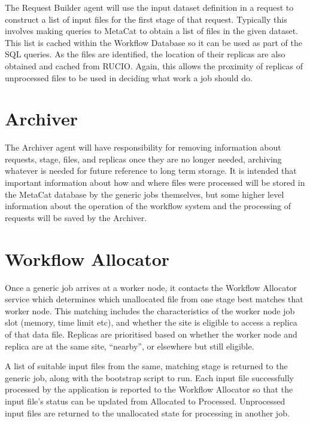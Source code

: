 \documentclass[../main-v1.tex]{subfiles}
\begin{document}
The Request Builder agent will use the input dataset definition in a request to construct a list of input files for the first stage of that request. Typically this involves making queries to MetaCat to obtain a list of files in the given dataset. This list is cached within the Workflow Database so it can be used as part of the SQL queries. As the files are identified, the location of their replicas are also obtained and cached from RUCIO. Again, this allows the proximity of replicas of unprocessed files to be used in deciding what work a job should do.

\section{Archiver}
\label{sec:flow:archiver}

The Archiver agent will have responsibility for removing information about requests, stage, files, and replicas once they are no longer needed, archiving whatever is needed for future reference to long term storage. It is intended that important information about how and where files were processed will be stored in the MetaCat database by the generic jobs themselves, but some higher level information about the operation of the workflow system and the processing of requests will be saved by the Archiver.

\section{Workflow Allocator}
\label{sec:flow:allocator}

Once a generic job arrives at a worker node, it contacts the Workflow Allocator service which determines which unallocated file from one stage best matches that worker node. This matching includes the characteristics of the worker node job slot (memory, time limit etc), and whether the site is eligible to access a replica of that data file. Replicas are prioritised based on whether the worker node and replica are at the same site, ``nearby'', or elsewhere but still eligible. 

A list of suitable input files from the same, matching stage is returned to the generic job, along with the bootstrap script to run. Each input file successfully processed by the application is reported to the Workflow Allocator so that the input file’s status can be updated from Allocated to Processed. Unprocessed input files are returned to the unallocated state for processing in another job. 
\end{document}
